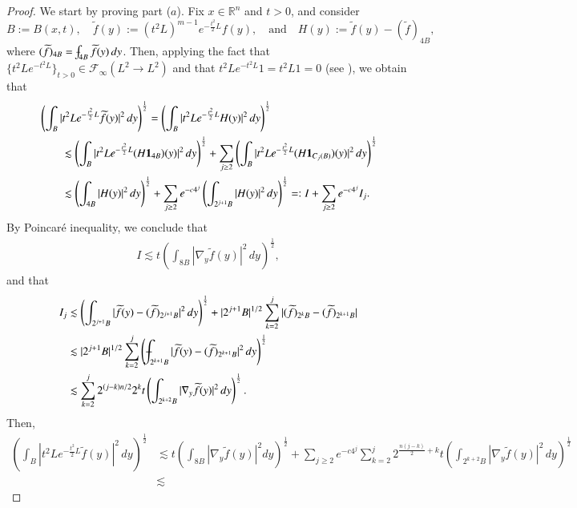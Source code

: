\documentclass[11pt, a4paper,leqno]{amsart}
\def\Xint#1{\mathchoice
    {\XXint\displaystyle\textstyle{#1}}%
    {\XXint\textstyle\scriptstyle{#1}}%
    {\XXint\scriptstyle\scriptscriptstyle{#1}}%
    {\XXint\scriptscriptstyle\scriptscriptstyle{#1}}%
    \!\int}
\def\XXint#1#2#3{{\setbox0=\hbox{$#1{#2#3}{\int}$}
    \vcenter{\hbox{$#2#3$}}\kern-.5\wd0}}
\def\dashint{\Xint-}
\def\Xint#1{\mathchoice
    {\XXint\displaystyle\textstyle{#1}}%
    {\XXint\textstyle\scriptstyle{#1}}%
    {\XXint\scriptstyle\scriptscriptstyle{#1}}%
    {\XXint\scriptscriptstyle\scriptscriptstyle{#1}}%
    \!\int}
\def\XXint#1#2#3{{\setbox0=\hbox{$#1{#2#3}{\int}$}
    \vcenter{\hbox{$#2#3$}}\kern-.5\wd0}}
\renewcommand{\chi}{{\bf 1}}
\theoremstyle{plain}
\theoremstyle{definition}
\theoremstyle{remark}
\numberwithin{equation}{section}
\def \R{ \mathbb{R} }
\begin{document}
\begin{proof}
We start by proving part ($a$).
Fix $x\in \R^n$ and $t>0$, and consider 
$$
B:=B(x, t),\quad  \widetilde{f}(y):=(t^2L)^{m-1}e^{-\frac{t^2}{2}L}f(y),\quad \textrm{and}\quad H(y):=\widetilde{f}(y)-(\widetilde{f})_{4B},
$$
where
$(\widetilde{f})_{4B}=\dashint_{4B}\widetilde{f}(y)\,dy$.
Then, applying the fact that $\{t^2Le^{-t^2L}\}_{t>0}\in \mathcal{F}_{\infty}(L^2\rightarrow L^2)$ and  that $t^2Le^{-t^2L}1=t^2L1=0$ (see \cite{Auscher}), we  obtain that
\begin{align*}
&\left(\int_{B}
|t^2Le^{-\frac{t^2}{2}L}\widetilde{f}(y)|^2\,dy\right)^{\frac{1}{2}}
=
\left(\int_{B}
|t^2Le^{-\frac{t^2}{2}L}H(y)|^2\,dy\right)^{\frac{1}{2}}
\\
&\qquad
\lesssim
\left(\int_{B}
|t^2Le^{-\frac{t^2}{2}L}(H\chi_{4B})(y)|^2\,dy\right)^{\frac{1}{2}}
+
\sum_{j\geq 2}\left(\int_{B}
|t^2Le^{-\frac{t^2}{2}L}(H\chi_{C_j(B)})(y)|^2\,dy\right)^{\frac{1}{2}}
\\
&\qquad
\lesssim
\left(\int_{4B}
|H(y)|^2\,dy\right)^{\frac{1}{2}}
+
\sum_{j\geq 2}e^{-c4^{j}}\left(\int_{2^{j+1}B}
|H(y)|^2\,dy\right)^{\frac{1}{2}}=:I+\sum_{j\geq 2}e^{-c4^{j}}I_j.
\\
\end{align*}
By Poincar\'e inequality, we conclude that
\begin{align*}
I\lesssim  t\left(\int_{8B}|\nabla_y \widetilde{f}(y)|^2\,dy\right)^{\frac{1}{2}},
\end{align*}
and that
\begin{align*}
I_j&
\lesssim 
\left(\int_{2^{j+1}B}|\widetilde{f}(y)-(\widetilde{f})_{2^{j+1}B}|^2\,dy\right)^{\frac{1}{2}}
+|2^{j+1}B|^{1/2}
\sum_{k=2}^{j}|(\widetilde{f})_{2^{k}B}-(\widetilde{f})_{2^{k+1}B}|
\\
&
\lesssim
|2^{j+1}B|^{1/2}
\sum_{k=2}^{j}\left(\dashint_{2^{k+1}B}|\widetilde{f}(y)-(\widetilde{f})_{2^{k+1}B}|^2\,dy\right)^{\frac{1}{2}}
\\
&
\lesssim
\sum_{k=2}^{j}2^{(j-k)n/2}2^{k} t\left(\int_{2^{k+2}B}|\nabla_y \widetilde{f}(y)|^2\,dy\right)^{\frac{1}{2}}.
\end{align*}
Then,
\begin{align*}
\left(\int_{B}
|t^2Le^{-\frac{t^2}{2}L}\widetilde{f}(y)|^2\,dy\right)^{\frac{1}{2}}
&
\lesssim  t\left(\int_{8B}|\nabla_y\widetilde{f}(y)|^2dy\right)^{\frac{1}{2}}
+
\sum_{j\geq 2} e^{-c4^j}\sum_{k=2}^{j}2^{\frac{n(j-k)}{2}+k}
 t\left(\int_{2^{k+2}B}| \nabla_y\widetilde{f}(y)|^2\,dy\right)^{\frac{1}{2}}
\\
&
\lesssim

\end{align*}
\end{proof}
\end{document}
